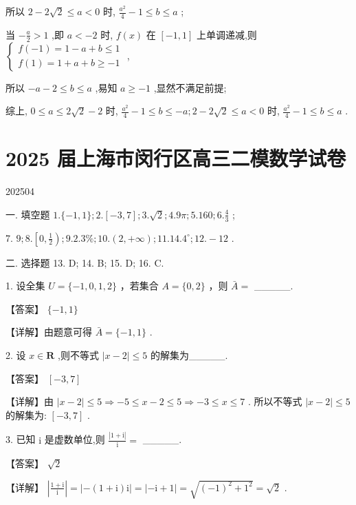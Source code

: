 \documentclass[10pt]{article}
\begin{document}
所以 \(2 - 2\sqrt{2} \leq  a < 0\) 时, \(\frac{{a}^{2}}{4} - 1 \leq  b \leq  a\) ;

当 \(- \frac{a}{2} > 1\) ,即 \(a <  - 2\) 时, \(f\left( x\right)\) 在 \(\left\lbrack  {-1,1}\right\rbrack\) 上单调递减,则 \(\left\{  \begin{array}{l} f\left( {-1}\right)  = 1 - a + b \leq  1 \\  f\left( 1\right)  = 1 + a + b \geq   - 1 \end{array}\right.\) ,

所以 \(- a - 2 \leq  b \leq  a\) ,易知 \(a \geq   - 1\) ,显然不满足前提;

综上, \(0 \leq  a \leq  2\sqrt{2} - 2\) 时, \(\frac{{a}^{2}}{4} - 1 \leq  b \leq   - a;2 - 2\sqrt{2} \leq  a < 0\) 时, \(\frac{{a}^{2}}{4} - 1 \leq  b \leq  a\) .

\section*{2025 届上海市闵行区高三二模数学试卷}

202504

一. 填空题 \(1.\{  - 1,1\} ;2.\left\lbrack  {-3,7}\right\rbrack  ;3.\sqrt{2};{4.9\pi };{5.160};6.\frac{4}{3}\) ;

7. \(9;8.\left\lbrack  {0,\frac{1}{2}}\right) ;9.{2.3}\% ;{10}.\left( {2, + \infty }\right) ;{11}.{14.4}^{ \circ  };{12}. - {12}\) .

二. 选择题 13. D; 14. B; 15. D; 16. C.

1. 设全集 \(U = \{  - 1,0,1,2\}\) ，若集合 \(A = \{ 0,2\}\) ，则 \(\bar{A} =\) \_\_\_\_\_.

【答案】 \(\{  - 1,1\}\)

【详解】由题意可得 \(\bar{A} = \{  - 1,1\}\) .

2. 设 \(x \in  \mathbf{R}\) ,则不等式 \(\left| {x - 2}\right|  \leq  5\) 的解集为\_\_\_\_\_.

【答案】 \(\left\lbrack  {-3,7}\right\rbrack\)

【详解】由 \(\left| {x - 2}\right|  \leq  5 \Rightarrow   - 5 \leq  x - 2 \leq  5 \Rightarrow   - 3 \leq  x \leq  7\) . 所以不等式 \(\left| {x - 2}\right|  \leq  5\) 的解集为: \(\left\lbrack  {-3,7}\right\rbrack\) .

3. 已知 \(\mathrm{i}\) 是虚数单位,则 \(\frac{\left| 1 + \mathrm{i}\right| }{\mathrm{i}} =\) \_\_\_\_\_.

【答案】 \(\sqrt{2}\)

【详解】 \(\left| \frac{1 + \mathrm{i}}{\mathrm{i}}\right|  = \left| {-\left( {1 + \mathrm{i}}\right) \mathrm{i}}\right|  = \left| {-\mathrm{i} + 1}\right|  = \sqrt{{\left( -1\right) }^{2} + {1}^{2}} = \sqrt{2}\) .
\end{document}
